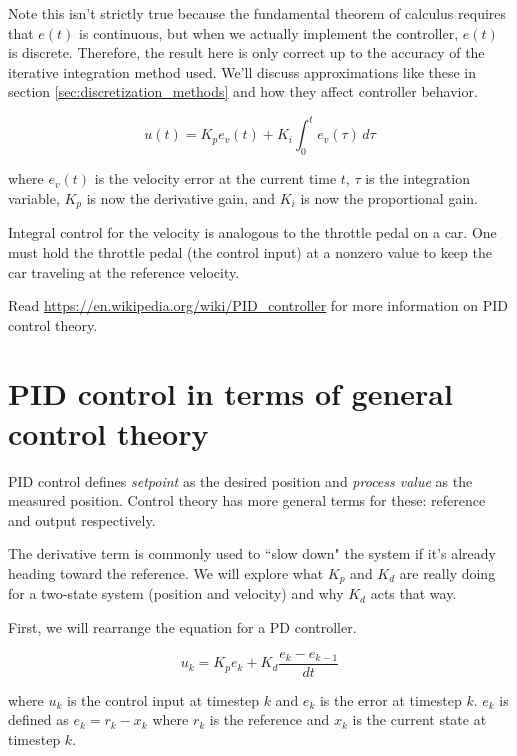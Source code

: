 Note this isn't strictly true because the fundamental theorem of calculus
requires that $e(t)$ is continuous, but when we actually implement the
controller, $e(t)$ is discrete. Therefore, the result here is only correct up to
the accuracy of the iterative integration method used. We'll discuss
approximations like these in section \ref{sec:discretization_methods} and how
they affect controller behavior.

\begin{theorem}
  \begin{equation}
    u(t) = K_p e_v(t) + K_i \int_0^t e_v(\tau) \,d\tau
  \end{equation}

  where $e_v(t)$ is the velocity error at the current time $t$, $\tau$ is the
  integration variable, $K_p$ is now the derivative gain, and $K_i$ is now the
  proportional gain.

  \label{thm:vel_pid}
\end{theorem}

Integral control for the velocity is analogous to the throttle pedal on a car.
One must hold the throttle pedal (the control input) at a nonzero value to keep
the car traveling at the reference velocity.

Read \url{https://en.wikipedia.org/wiki/PID_controller} for more information on
PID control theory.

\section{PID control in terms of general control theory}

PID control defines \textit{setpoint} as the desired position and
\textit{process value} as the measured position. Control theory has more general
terms for these: \gls{reference} and \gls{output} respectively.

The derivative term is commonly used to ``slow down" the system if it's already
heading toward the \gls{reference}. We will explore what $K_p$ and $K_d$ are
really doing for a two-state system (position and velocity) and why $K_d$ acts
that way.

First, we will rearrange the equation for a PD controller.

\begin{equation*}
  u_k = K_p e_k + K_d \frac{e_k - e_{k-1}}{dt}
\end{equation*}

where $u_k$ is the control input at timestep $k$ and $e_k$ is the error at
timestep $k$. $e_k$ is defined as $e_k = r_k - x_k$ where $r_k$ is the reference
and $x_k$ is the current state at timestep $k$.

